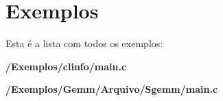 \section{Exemplos}
Esta é a lista com todos os exemplos\+:\begin{DoxyCompactItemize}
\item 
\textbf{ /\+Exemplos/clinfo/main.\+c}
\item 
\textbf{ /\+Exemplos/\+Gemm/\+Arquivo/\+Sgemm/main.\+c}
\end{DoxyCompactItemize}
